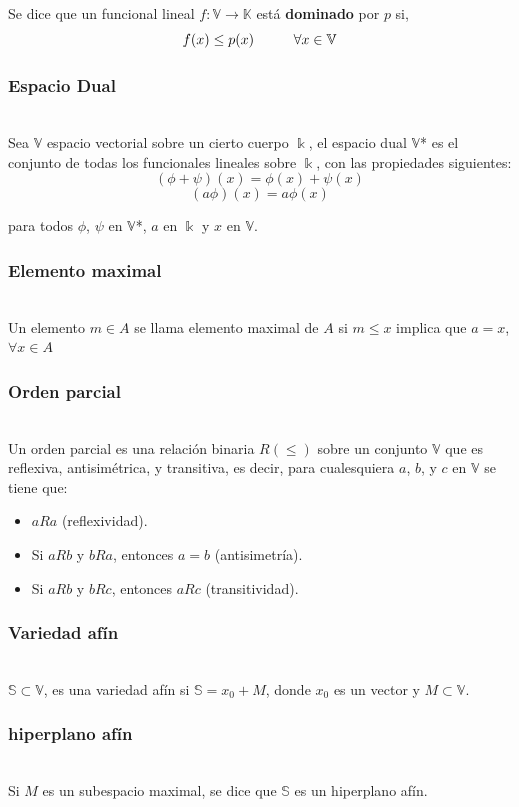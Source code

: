 \documentclass[10pt]{amsart}
\theoremstyle{remark}
\numberwithin{equation}{section}
\begin{document}
Se dice que un funcional lineal $f:\mathbb{V} \longrightarrow \mathbb{K} $ está \textbf{dominado} por $p$ si,
\[f(x) \leq p(x) \hspace*{1cm} \forall x \in \mathbb{V} \] 

\subsubsection{Espacio Dual} \cite{Web17}\\ Sea $\mathbb{V}$ espacio vectorial sobre un cierto cuerpo $ \Bbbk $, el espacio dual $\mathbb{V}$* es el conjunto de todas los funcionales lineales sobre $ \Bbbk $, con las propiedades siguientes:
\[(\phi + \psi)(x)=\phi (x)+\psi (x) \]
\[(a\phi )(x) = a\phi(x) \]

para todos $\phi$, $\psi$ en $\mathbb{V}$*, $a$ en $ \Bbbk $ y $x$ en $\mathbb{V}$. %
\subsubsection{Elemento maximal} \ \\
Un elemento $m \in A$ se llama elemento maximal de $A$ si $m \leq x$ implica que $a = x$, $\forall x \in A$
\subsubsection{Orden parcial} \cite{Web17} \\ Un orden parcial es una relación binaria $R(\leq)$ sobre un conjunto $\mathbb{V}$ que es reflexiva, antisimétrica, y transitiva, es decir, para cualesquiera $a$, $b$, y $c$ en $\mathbb{V}$ se tiene que: \begin{itemize}
\item $aRa$ (reflexividad).
\item Si $aRb$ y $bRa$, entonces $a = b$ (antisimetría). \item Si $aRb$ y $bRc$, entonces $aRc$ (transitividad). \end{itemize} 
\subsubsection{Variedad afín} \ \\ $\mathbb{S} \subset \mathbb{V}$, es una variedad afín si $\mathbb{S} = x_0 + M$, donde $x_0$ es un vector y $M \subset \mathbb{V}$.

\subsubsection{hiperplano afín} \ \\
Si $M$ es un subespacio maximal, se dice que $\mathbb{S}$ es un hiperplano afín.
\end{document}
